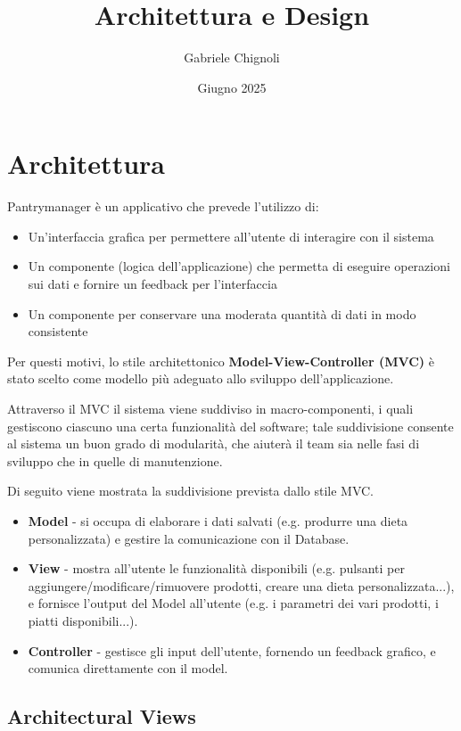 \documentclass{article}
\title{\huge Architettura e Design}
\author{Gabriele Chignoli}
\date{Giugno 2025}
\begin{document}
\maketitle
\tableofcontents
\newpage

\section{Architettura}
Pantrymanager è un applicativo che prevede l'utilizzo di:
\begin{itemize}
    \item Un'interfaccia grafica per permettere all'utente di interagire con il sistema
    \item Un componente (logica dell'applicazione) che permetta di eseguire operazioni sui dati e fornire un feedback per l'interfaccia
    \item Un componente per conservare una moderata quantità di dati in modo consistente
\end{itemize}
Per questi motivi, lo stile architettonico \textbf{Model-View-Controller (MVC)} è stato scelto come modello più adeguato allo sviluppo dell'applicazione. 

Attraverso il MVC il sistema viene suddiviso in macro-componenti, i quali gestiscono ciascuno una certa funzionalità del software; tale suddivisione consente al sistema un buon grado di modularità, che aiuterà il team sia nelle fasi di sviluppo che in quelle di manutenzione. \newline 

Di seguito viene mostrata la suddivisione prevista dallo stile MVC.  

\begin{itemize}
    \item \textbf{Model} - si occupa di elaborare i dati salvati (e.g. produrre una dieta personalizzata) e gestire la comunicazione con il Database.  
    \item \textbf{View} - mostra all'utente le funzionalità disponibili (e.g. pulsanti per aggiungere/modificare/rimuovere prodotti, creare una dieta personalizzata...), e fornisce l'output del Model all'utente (e.g. i parametri dei vari prodotti, i piatti disponibili...). 
    \item \textbf{Controller} - gestisce gli input dell'utente, fornendo un feedback grafico, e comunica direttamente con il model. 
\end{itemize}

\subsection{Architectural Views}
\end{document}
